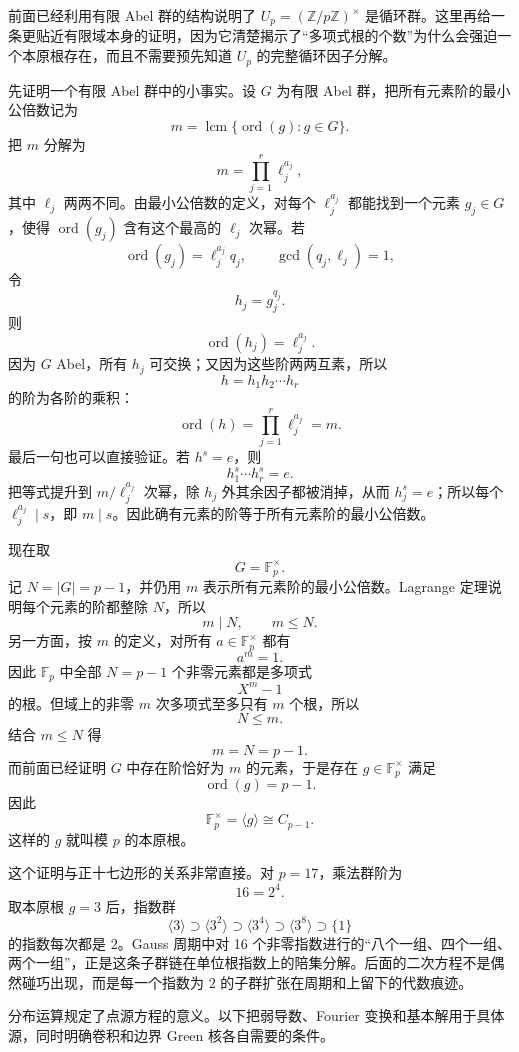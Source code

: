 前面已经利用有限 Abel 群的结构说明了 $U_p=(\mathbb Z/p\mathbb Z)^\times$ 是循环群。这里再给一条更贴近有限域本身的证明，因为它清楚揭示了``多项式根的个数''为什么会强迫一个本原根存在，而且不需要预先知道 $U_p$ 的完整循环因子分解。

先证明一个有限 Abel 群中的小事实。设 $G$ 为有限 Abel 群，把所有元素阶的最小公倍数记为
\[
m=\operatorname{lcm}\{\operatorname{ord}(g):g\in G\}.
\]
把 $m$ 分解为
\[
m=\prod_{j=1}^r \ell_j^{a_j},
\]
其中 $\ell_j$ 两两不同。由最小公倍数的定义，对每个 $\ell_j^{a_j}$ 都能找到一个元素 $g_j\in G$，使得 $\operatorname{ord}(g_j)$ 含有这个最高的 $\ell_j$ 次幂。若
\[
\operatorname{ord}(g_j)=\ell_j^{a_j}q_j,
\qquad \gcd(q_j,\ell_j)=1,
\]
令
\[
h_j=g_j^{q_j}.
\]
则
\[
\operatorname{ord}(h_j)=\ell_j^{a_j}.
\]
因为 $G$ Abel，所有 $h_j$ 可交换；又因为这些阶两两互素，所以
\[
h=h_1h_2\cdots h_r
\]
的阶为各阶的乘积：
\[
\operatorname{ord}(h)=
\prod_{j=1}^r\ell_j^{a_j}=m.
\]
最后一句也可以直接验证。若 $h^s=e$，则
\[
h_1^s\cdots h_r^s=e.
\]
把等式提升到 $m/\ell_j^{a_j}$ 次幂，除 $h_j$ 外其余因子都被消掉，从而 $h_j^s=e$；所以每个 $\ell_j^{a_j}\mid s$，即 $m\mid s$。因此确有元素的阶等于所有元素阶的最小公倍数。

现在取
\[
G=\mathbb F_p^\times.
\]
记 $N=|G|=p-1$，并仍用 $m$ 表示所有元素阶的最小公倍数。Lagrange 定理说明每个元素的阶都整除 $N$，所以
\[
m\mid N,
\qquad m\le N.
\]
另一方面，按 $m$ 的定义，对所有 $a\in\mathbb F_p^\times$ 都有
\[
a^m=1.
\]
因此 $\mathbb F_p$ 中全部 $N=p-1$ 个非零元素都是多项式
\[
X^m-1
\]
的根。但域上的非零 $m$ 次多项式至多只有 $m$ 个根，所以
\[
N\le m.
\]
结合 $m\le N$ 得
\[
m=N=p-1.
\]
而前面已经证明 $G$ 中存在阶恰好为 $m$ 的元素，于是存在 $g\in\mathbb F_p^\times$ 满足
\[
\operatorname{ord}(g)=p-1.
\]
因此
\begin{equation*}\boxed{
\mathbb F_p^\times=\langle g\rangle\cong C_{p-1}
}.\end{equation*}
这样的 $g$ 就叫模 $p$ 的本原根。

这个证明与正十七边形的关系非常直接。对 $p=17$，乘法群阶为
\[
16=2^4.
\]
取本原根 $g=3$ 后，指数群
\[
\langle3\rangle
\supset
\langle3^2\rangle
\supset
\langle3^4\rangle
\supset
\langle3^8\rangle
\supset
\{1\}
\]
的指数每次都是 $2$。Gauss 周期中对 16 个非零指数进行的``八个一组、四个一组、两个一组''，正是这条子群链在单位根指数上的陪集分解。后面的二次方程不是偶然碰巧出现，而是每一个指数为 $2$ 的子群扩张在周期和上留下的代数痕迹。


分布运算规定了点源方程的意义。以下把弱导数、Fourier 变换和基本解用于具体源，同时明确卷积和边界 Green 核各自需要的条件。






